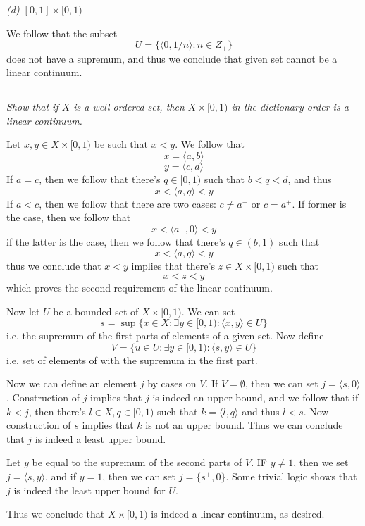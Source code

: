 \documentclass[11pt,oneside,titlepage]{book}
\newcommand{\eangle}[1]{\langle #1 \rangle}
\newcommand{\set}[1]{\{ #1 \}}
\begin{document}
\textit{(d) $[0, 1] \times [0, 1)$}

We follow that the subset
$$U = \set{\eangle{0, 1/n}: n \in Z_+}$$
does not have a supremum, and thus we conclude that given set cannot be a linear continuum.

\subsection{}

\textit{Show that if $X$ is a well-ordered set, then $X \times [0, 1)$ in the dictionary
  order is a linear continuum.}

Let $x, y \in X \times [0, 1)$ be such that $x < y$. We follow that
$$x = \eangle{a, b}$$
$$y = \eangle{c, d}$$
If $a = c$, then we follow that there's $q \in [0, 1)$ such that $b < q < d$, and thus
$$x < \eangle{a, q} < y$$
If $a < c$, then we follow that there are two cases: $c \neq a^+$ or $c = a^+$.
If former is the case, then we follow that
$$x < \eangle{a^+, 0} < y$$
if the latter is the case, then we follow that there's $q \in (b, 1)$ such that
$$x < \eangle{a, q} < y$$
thus we conclude that $x < y$ implies that there's $z \in X \times [0, 1)$ such that
$$x < z < y$$
which proves the second requirement of the linear continuum.

Now let $U$ be a bounded set of $X \times [0, 1)$. We can set
$$s = \sup\set{x \in X: \exists y \in [0, 1): \eangle{x, y} \in U}$$
i.e. the supremum of the first parts of elements of a given set.
Now define
$$V = \set{u \in U: \exists y \in [0, 1): \eangle{s, y} \in U}$$
i.e. set of elements of with the supremum in the first part.

Now we can define an element $j$ by cases on $V$. If $V = \emptyset$,
then we can set $j = \eangle{s, 0}$. Construction of $j$ implies that $j$ is
indeed an upper bound, and we follow that if $k < j$, then
there's $l \in X, q \in [0, 1)$ such that $k = \eangle{l, q}$ and thus $l < s$.
Now construction of $s$ implies that $k$ is not an upper bound. Thus we can conclude that
$j$ is indeed a least upper bound.

Let $y$ be equal to the supremum of the second parts of $V$. IF $y \neq 1$, then we set
$j = \eangle{s, y}$, and if $y = 1$, then we can set $j = \set{s^+, 0}$.
Some trivial logic shows that $j$ is indeed the least upper bound for $U$.

Thus we conclude that $X \times [0, 1)$ is indeed a linear continuum, as desired.

\subsection{}
\end{document}
